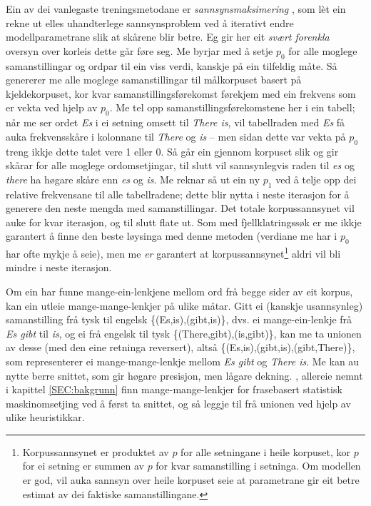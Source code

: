 \documentclass[11pt,a4paper,oneside,draft]{book}
\begin{document}
 Ein av dei vanlegaste treningsmetodane er \emph{sannsynsmaksimering}
 \citep[utførleg skildra i][]{prescher-em}, som lèt ein rekne ut elles
 uhandterlege sannsynsproblem ved å iterativt endre modellparametrane
 slik at skårene blir betre. Eg gir her eit \emph{svært forenkla} oversyn
 over korleis dette går føre seg. Me byrjar med å setje $p_0$ for alle
 moglege samanstillingar og ordpar til ein viss verdi, kanskje på ein
 tilfeldig måte. Så genererer me alle moglege samanstillingar til
 målkorpuset basert på kjeldekorpuset, kor kvar
 samanstillingsførekomst førekjem med ein frekvens som er vekta ved
 hjelp av $p_0$. Me tel opp samanstillingsførekomstene her i ein
 tabell; når me ser ordet \emph{Es} i ei setning omsett til \emph{There is}, vil
 tabellraden med \emph{Es} få auka frekvensskåre i kolonnane til \emph{There} og
 \emph{is} -- men sidan dette var vekta på $p_0$ treng ikkje dette talet
 vere 1 eller 0. Så går ein gjennom korpuset slik og gir skårar for
 alle moglege ordomsetjingar, til slutt vil sannsynlegvis raden til
 \emph{es} og \emph{there} ha høgare skåre enn \emph{es} og \emph{is}. Me reknar så ut ein
 ny $p_1$ ved å telje opp dei relative frekvensane til alle
 tabellradene; dette blir nytta i neste iterasjon for å generere den
 neste mengda med samanstillingar. Det totale korpussannsynet vil auke
 for kvar iterasjon, og til slutt flate ut. Som med fjellklatringssøk
 er me ikkje garantert å finne den beste løysinga med denne metoden
 (verdiane me har i $p_0$ har ofte mykje å seie), men me \emph{er}
 garantert at korpussannsynet\footnote{Korpussannsynet er produktet av $p$ for alle setningane i
        heile korpuset, kor $p$ for ei setning er summen av $p$ for
        kvar samanstilling i setninga. Om modellen er god, vil auka
        sannsyn over heile korpuset seie at parametrane gir eit betre
        estimat av dei faktiske samanstillingane. } aldri vil bli mindre i neste
 iterasjon.

 Om ein har funne mange-ein-lenkjene mellom ord frå begge sider av eit
 korpus, kan ein utleie mange-mange-lenkjer på ulike måtar. Gitt ei
 (kanskje usannsynleg) samanstilling frå tysk til engelsk
 \{(Es,is),(gibt,is)\}, dvs. ei mange-ein-lenkje frå \emph{Es gibt} til
 \emph{is}, og ei frå engelsk til tysk \{(There,gibt),(is,gibt)\}, kan me
 ta unionen av desse (med den eine retninga reversert), altså
 \{(Es,is),(gibt,is),(gibt,There)\}, som representerer ei
 mange-mange-lenkje mellom \emph{Es gibt} og \emph{There is}. Me kan au nytte
 berre snittet, som gir høgare presisjon, men lågare dekning.
 \citet{koehn2003spb}, allereie nemnt i kapittel \ref{SEC:bakgrunn}
 finn mange-mange-lenkjer for frasebasert statistisk maskinomsetjing
 ved å først ta snittet, og så leggje til frå unionen ved hjelp av
 ulike heuristikkar.
\end{document}
